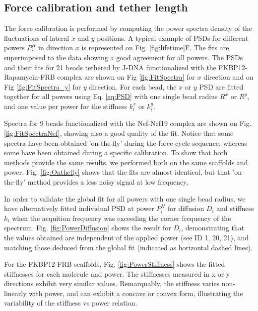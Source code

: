 \documentclass{biophys-new}
\begin{document}

\subsection*{Force calibration and tether length}
The force calibration is performed by computing the power spectra density of the fluctuations of lateral $x$ and $y$ positions. A typical example of PSDs for different powers $P^H_i$ in direction $x$ is represented on Fig. \ref{fig:lifetime}F. The fits are superimposed to the data showing a good agreement for all powers. The PSDs and their fits for 21 beads tethered by J-DNA functionalized with the FKBP12-Rapamycin-FRB complex are shown on Fig \ref{fig:FitSpectra} for $x$ direction and on Fig \ref{fig:FitSpectra_y} for $y$ direction. For each bead, the $x$ or $y$ PSD are fitted together for all powers using Eq. \ref{eq:PSD} with one single bead radius $R^x$ or $R^y$, and one value per power for the stiffness $k^x_i$ or $k^y_i$.

Spectra for 9 beads functionalized with the Nef-Nef19 complex are shown on Fig. \ref{fig:FitSpectraNef}, showing also a good quality of the fit. Notice that some spectra have been obtained 'on-the-fly' during the force cycle sequence, whereas some have been obtained during a specific calibration. To show that both methods provide the same results, we performed both on the same scaffolds and power. Fig. \ref{fig:Onthefly} shows that the fits are almost identical, but that 'on-the-fly' method provides a less noisy signal at low frequency.

In order to validate the global fit for all powers with one single bead radius, we have alternatively fitted individual PSD at power $P^H_i$ for diffusion $D_i$ and stiffness $k_i$ when the acquition frequency was exceeding the corner frequency of the spectrum.
Fig. \ref{fig:PowerDiffusion} shows the result for $D_i$, demonstrating that the values obtained are independent of the applied power (see ID 1, 20, 21), and matching those deduced from the global fit (indicated as horizontal dashed lines).

For the FKBP12-FRB scaffolds, Fig. \ref{fig:PowerStiffness} shows the fitted stiffnesses for each molecule and power. The stiffnesses measured in x or y directions exhibit very similar values. Remarquably, the stiffness varies non-linearly with power, and can exhibit a concave or convex form, illustrating the variability of the stiffness vs power relation.
\end{document}
